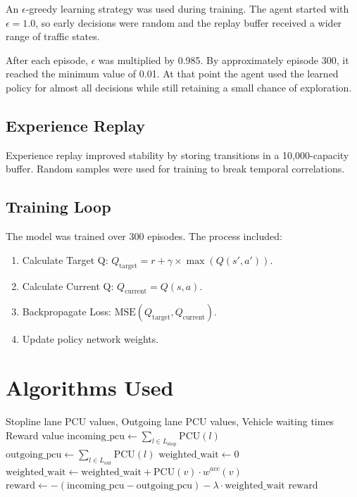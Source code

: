 An $\epsilon$-greedy learning strategy was used during training. The
agent started with $\epsilon = 1.0$, so early decisions were random and
the replay buffer received a wider range of traffic states.

After each episode, $\epsilon$ was multiplied by 0.985. By approximately
episode 300, it reached the minimum value of 0.01. At that point the
agent used the learned policy for almost all decisions while still
retaining a small chance of exploration.
\subsection{Experience Replay}
\noindent Experience replay improved stability by storing transitions in a 10,000-capacity buffer. Random samples were used for training to break temporal correlations.

\subsection{Training Loop}
\noindent The model was trained over 300 episodes. The process included:
\begin{enumerate}
    \item Calculate Target Q: $Q_{\text{target}} = r + \gamma \times \max(Q(s', a'))$.
    \item Calculate Current Q: $Q_{\text{current}} = Q(s, a)$.
    \item Backpropagate Loss: $\text{MSE}(Q_{\text{target}}, Q_{\text{current}})$.
    \item Update policy network weights.
\end{enumerate}

\section{Algorithms Used}
\label{sec:algorithms}

\begin{algorithm}
\caption{Reward Calculation}
\begin{algorithmic}[1]
\Require Stopline lane PCU values, Outgoing lane PCU values, Vehicle waiting times
\Ensure Reward value
    \State $\text{incoming\_pcu} \leftarrow \sum_{l \in L_{\text{stop}}} \text{PCU}(l)$
    \State $\text{outgoing\_pcu} \leftarrow \sum_{l \in L_{\text{out}}} \text{PCU}(l)$
    \State $\text{weighted\_wait} \leftarrow 0$
            \State $\text{weighted\_wait} \leftarrow \text{weighted\_wait} + \text{PCU}(v) \cdot w^{acc}(v)$
        \EndFor
    \EndFor
    \State $\text{reward} \leftarrow -(\text{incoming\_pcu} - \text{outgoing\_pcu}) - \lambda \cdot \text{weighted\_wait}$
    \State \Return $\text{reward}$
\EndProcedure
\end{algorithmic}
\end{algorithm}

